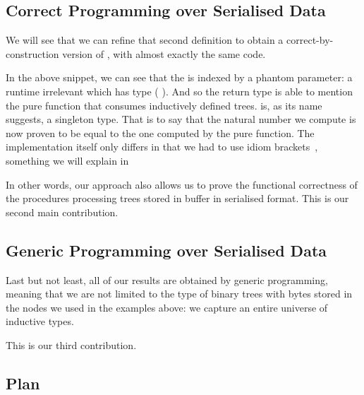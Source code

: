 \subsection{Correct Programming over Serialised Data}

We will see that we can refine that second definition to obtain
a correct-by-construction version of
, with almost exactly the same code.

\begin{center}
  \begin{minipage}{.7\textwidth}
  \end{minipage}
\end{center}

In the above snippet, we can see that the  is indexed
by a phantom parameter: a runtime irrelevant  which has type
( ).
%
And so the return type is able to mention the pure 
function that consumes inductively defined trees.
%
 is, as its name suggests, a singleton type. That is
to say that the natural number we compute is now proven to be equal to the
one computed by the pure  function.
%
The implementation itself only differs in that we had to use idiom
brackets~\cite{DBLP:journals/jfp/McbrideP08}, something we will explain
in 

In other words, our approach also allows us to prove the functional
correctness of the  procedures processing trees stored
in buffer in serialised format. This is our second main contribution.

\subsection{Generic Programming over Serialised Data}

Last but not least, all of our results are obtained by generic programming,
meaning that we are not limited to the type of binary trees with bytes stored
in the nodes we used in the examples above: we capture an entire universe of
inductive types.

This is our third contribution.


\subsection{Plan}

